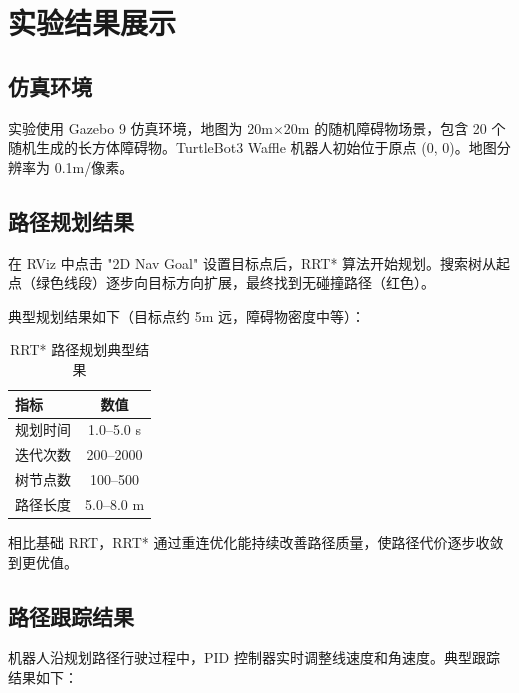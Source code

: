 \documentclass{SYSUReport}
\begin{document}
\section{实验结果展示}

\subsection{仿真环境}

实验使用 Gazebo 9 仿真环境，地图为 20m$\times$20m 的随机障碍物场景，包含 20 个随机生成的长方体障碍物。TurtleBot3 Waffle 机器人初始位于原点 (0, 0)。地图分辨率为 0.1m/像素。

\subsection{路径规划结果}

在 RViz 中点击 "2D Nav Goal" 设置目标点后，RRT* 算法开始规划。搜索树从起点（绿色线段）逐步向目标方向扩展，最终找到无碰撞路径（红色）。

典型规划结果如下（目标点约 5m 远，障碍物密度中等）：

\begin{table}[H]
    \centering
    \caption{RRT* 路径规划典型结果}
    \begin{tabular}{lc}
        \toprule
        \textbf{指标} & \textbf{数值} \\
        \midrule
        规划时间 & 1.0--5.0 s \\
        迭代次数 & 200--2000 \\
        树节点数 & 100--500 \\
        路径长度 & 5.0--8.0 m \\
        \bottomrule
    \end{tabular}
\end{table}

相比基础 RRT，RRT* 通过重连优化能持续改善路径质量，使路径代价逐步收敛到更优值。

\subsection{路径跟踪结果}

机器人沿规划路径行驶过程中，PID 控制器实时调整线速度和角速度。典型跟踪结果如下：
\end{document}
